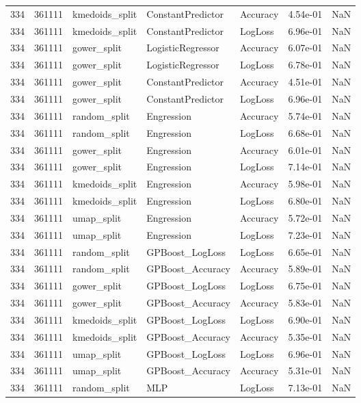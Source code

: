 \begin{tabular}{rrlllrr}
334 & 361111 & kmedoids\_split & ConstantPredictor & Accuracy & 4.54e-01 & NaN \\
334 & 361111 & kmedoids\_split & ConstantPredictor & LogLoss & 6.96e-01 & NaN \\
334 & 361111 & gower\_split & LogisticRegressor & Accuracy & 6.07e-01 & NaN \\
334 & 361111 & gower\_split & LogisticRegressor & LogLoss & 6.78e-01 & NaN \\
334 & 361111 & gower\_split & ConstantPredictor & Accuracy & 4.51e-01 & NaN \\
334 & 361111 & gower\_split & ConstantPredictor & LogLoss & 6.96e-01 & NaN \\
334 & 361111 & random\_split & Engression & Accuracy & 5.74e-01 & NaN \\
334 & 361111 & random\_split & Engression & LogLoss & 6.68e-01 & NaN \\
334 & 361111 & gower\_split & Engression & Accuracy & 6.01e-01 & NaN \\
334 & 361111 & gower\_split & Engression & LogLoss & 7.14e-01 & NaN \\
334 & 361111 & kmedoids\_split & Engression & Accuracy & 5.98e-01 & NaN \\
334 & 361111 & kmedoids\_split & Engression & LogLoss & 6.80e-01 & NaN \\
334 & 361111 & umap\_split & Engression & Accuracy & 5.72e-01 & NaN \\
334 & 361111 & umap\_split & Engression & LogLoss & 7.23e-01 & NaN \\
334 & 361111 & random\_split & GPBoost\_LogLoss & LogLoss & 6.65e-01 & NaN \\
334 & 361111 & random\_split & GPBoost\_Accuracy & Accuracy & 5.89e-01 & NaN \\
334 & 361111 & gower\_split & GPBoost\_LogLoss & LogLoss & 6.75e-01 & NaN \\
334 & 361111 & gower\_split & GPBoost\_Accuracy & Accuracy & 5.83e-01 & NaN \\
334 & 361111 & kmedoids\_split & GPBoost\_LogLoss & LogLoss & 6.90e-01 & NaN \\
334 & 361111 & kmedoids\_split & GPBoost\_Accuracy & Accuracy & 5.35e-01 & NaN \\
334 & 361111 & umap\_split & GPBoost\_LogLoss & LogLoss & 6.96e-01 & NaN \\
334 & 361111 & umap\_split & GPBoost\_Accuracy & Accuracy & 5.31e-01 & NaN \\
334 & 361111 & random\_split & MLP & LogLoss & 7.13e-01 & NaN \\

\end{tabular}
